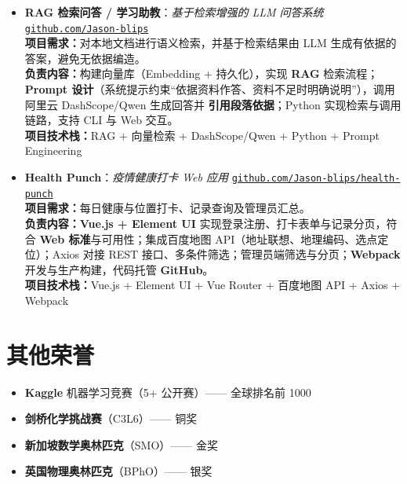 \documentclass[a4paper]{article}
\begin{document}
\begin{itemize}[leftmargin=0pt, itemsep=8pt, label={}]
\item
  \textbf{RAG 检索问答 / 学习助教}：\textit{基于检索增强的 LLM 问答系统}
  \hfill \href{https://github.com/Jason-blips}{\texttt{github.com/Jason-blips}}\\[2pt]
  \textbf{项目需求：}对本地文档进行语义检索，并基于检索结果由 LLM 生成有依据的答案，避免无依据编造。\\
  \textbf{负责内容：}构建向量库（Embedding + 持久化），实现 \textbf{RAG} 检索流程；\textbf{Prompt 设计}（系统提示约束“依据资料作答、资料不足时明确说明”），调用阿里云 DashScope/Qwen 生成回答并 \textbf{引用段落依据}；Python 实现检索与调用链路，支持 CLI 与 Web 交互。\\
  \textbf{项目技术栈：}RAG \;+\; 向量检索 \;+\; DashScope/Qwen \;+\; Python \;+\; Prompt Engineering
\end{itemize}
\vspace{0.2cm}

\begin{itemize}[leftmargin=0pt, itemsep=8pt, label={}]
\item
  \textbf{Health Punch}：\textit{疫情健康打卡 Web 应用}
  \hfill \href{https://github.com/Jason-blips/health-punch}{\texttt{github.com/Jason-blips/health-punch}}\\[2pt]
  \textbf{项目需求：}每日健康与位置打卡、记录查询及管理员汇总。\\
  \textbf{负责内容：}\textbf{Vue.js + Element UI} 实现登录注册、打卡表单与记录分页，符合 \textbf{Web 标准}与可用性；集成百度地图 API（地址联想、地理编码、选点定位）；Axios 对接 REST 接口、多条件筛选；管理员端筛选与分页；\textbf{Webpack} 开发与生产构建，代码托管 \textbf{GitHub}。\\
  \textbf{项目技术栈：}Vue.js \;+\; Element UI \;+\; Vue Router \;+\; 百度地图 API \;+\; Axios \;+\; Webpack
\end{itemize}
\vspace{0.2cm}

\section{其他荣誉}
\begin{itemize}
  \item \textbf{Kaggle} 机器学习竞赛（5+ 公开赛）—— 全球排名前 1000
  \item \textbf{剑桥化学挑战赛}（C3L6）—— 铜奖
  \item \textbf{新加坡数学奥林匹克}（SMO）—— 金奖
  \item \textbf{英国物理奥林匹克}（BPhO）—— 银奖
\end{itemize}
\vspace{0.2cm}
\end{document}
